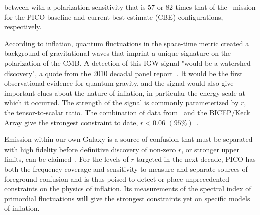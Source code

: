 \documentclass[PICOReport.tex]{subfiles}
\begin{document}

between with a polarization sensitivity that is 57 or 82 times that of the \planck\ mission for the PICO baseline and current best estimate (\ac{CBE}) configurations, respectively. 


According to inflation, quantum fluctuations in the space-time metric created a background of gravitational waves that imprint a unique signature on the polarization of the CMB. A detection of this \ac{IGW} signal "would be a watershed discovery", a quote from the 2010 decadal panel report~\citep{blandford2010}. It would be the first observational evidence for quantum gravity, and the signal would also give important clues about the nature of inflation, in particular the energy scale at which it occurred. The strength of the signal is commonly parameterized by $r$, the tensor-to-scalar ratio. The combination of data from \planck\ and the BICEP/Keck Array give the strongest constraint to date, $r<0.06\,\, (95\%)$~\citep{2018arXiv181005216A}.

Emission within our own Galaxy is a source of confusion that must be separated with high fidelity before definitive discovery of non-zero $r$, or stronger upper limits, can be claimed~\citep{2016A&A...586A.133P}. For the levels of $r$ targeted in the next decade, PICO has both the frequency coverage and sensitivity to measure and separate sources of foreground confusion and is thus poised to detect or place unprecedented constraints on the physics of inflation. Its measurements of the spectral index of primordial fluctuations will give the strongest constraints yet on specific models of inflation. 

\end{document}
